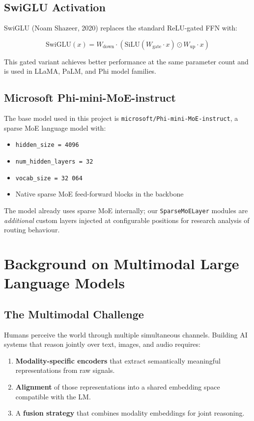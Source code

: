 \documentclass[11pt]{article}
\begin{document}
\subsection{SwiGLU Activation}


SwiGLU (Noam Shazeer, 2020) replaces the standard ReLU-gated FFN with:


$$\text{SwiGLU}(x) = W_{\text{down}} \cdot (\text{SiLU}(W_{\text{gate}} \cdot x) \odot W_{\text{up}} \cdot x)$$


This gated variant achieves better performance at the same parameter count and is used in LLaMA, PaLM, and Phi model families.


\subsection{Microsoft Phi-mini-MoE-instruct}


The base model used in this project is \texttt{microsoft/Phi-mini-MoE-instruct}, a sparse MoE language model with:

\begin{itemize}[leftmargin=*]
\item \texttt{hidden\_size = 4096}
\item \texttt{num\_hidden\_layers = 32}
\item \texttt{vocab\_size = 32 064}
\item Native sparse MoE feed-forward blocks in the backbone

\end{itemize}
The model already uses sparse MoE internally; our \texttt{SparseMoELayer} modules are \emph{additional} custom layers injected at configurable positions for research analysis of routing behaviour.



\section{Background on Multimodal Large Language Models}


\subsection{The Multimodal Challenge}


Humans perceive the world through multiple simultaneous channels. Building AI systems that reason jointly over text, images, and audio requires:

\begin{enumerate}[leftmargin=*]
\item \textbf{Modality-specific encoders} that extract semantically meaningful representations from raw signals.
\item \textbf{Alignment} of those representations into a shared embedding space compatible with the LM.
\item A \textbf{fusion strategy} that combines modality embeddings for joint reasoning.

\end{enumerate}
\end{document}
